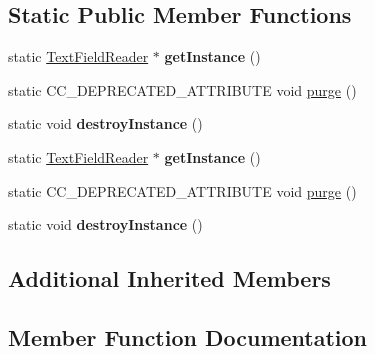 \subsection*{Static Public Member Functions}
\begin{DoxyCompactItemize}
\item 
\mbox{\label{classcocostudio_1_1TextFieldReader_a271391d056505ad39ee0923fcede2113}} 
static \hyperlink{classcocostudio_1_1TextFieldReader}{Text\+Field\+Reader} $\ast$ {\bfseries get\+Instance} ()
\item 
static C\+C\+\_\+\+D\+E\+P\+R\+E\+C\+A\+T\+E\+D\+\_\+\+A\+T\+T\+R\+I\+B\+U\+TE void \hyperlink{classcocostudio_1_1TextFieldReader_a30b51b3a07c817a9ffb67c32750f564e}{purge} ()
\item 
\mbox{\label{classcocostudio_1_1TextFieldReader_ad0efe783e7bd51f48f1df832c89abb4e}} 
static void {\bfseries destroy\+Instance} ()
\item 
\mbox{\label{classcocostudio_1_1TextFieldReader_a4fb4c8bc1d35246574be9918468c26fe}} 
static \hyperlink{classcocostudio_1_1TextFieldReader}{Text\+Field\+Reader} $\ast$ {\bfseries get\+Instance} ()
\item 
static C\+C\+\_\+\+D\+E\+P\+R\+E\+C\+A\+T\+E\+D\+\_\+\+A\+T\+T\+R\+I\+B\+U\+TE void \hyperlink{classcocostudio_1_1TextFieldReader_a30b51b3a07c817a9ffb67c32750f564e}{purge} ()
\item 
\mbox{\label{classcocostudio_1_1TextFieldReader_ad62d78d3c47d5254748af1c92b559dde}} 
static void {\bfseries destroy\+Instance} ()
\end{DoxyCompactItemize}
\subsection*{Additional Inherited Members}


\subsection{Member Function Documentation}
\mbox{\label{classcocostudio_1_1TextFieldReader_a30b51b3a07c817a9ffb67c32750f564e}} 

